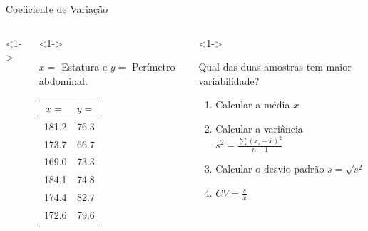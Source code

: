 \documentclass{beamer}
\begin{document}
\begin{frame}{Coeficiente de Variação}
  \begin{example}
    \begin{columns}<1->
      \begin{column}{5cm}<1->

        $x=$ Estatura e $y=$ Perímetro abdominal.

        \begin{tabular}{cc}
          $x=$ &$y=$\\
          \hline
          181.2 &76.3\\
          173.7&66.7\\
          169.0&73.3\\
          184.1&74.8\\
          174.4&82.7\\
          172.6&79.6\\
        \end{tabular}
      \end{column}
      \begin{column}{5cm}<1->

        Qual das duas amostras tem maior variabilidade?

        \begin{enumerate}
        \item Calcular a média $\bar{x}$
        \item Calcular a variância $s^2 = \frac{\sum (x_i - \bar{x})^2}{n-1}$
        \item Calcular o desvio padrão $s = \sqrt{s^2 }$
        \item $CV = \frac{s}{\bar{x}}$
        \end{enumerate}
      \end{column}
    \end{columns}
  \end{example}

\end{frame}
\end{document}
